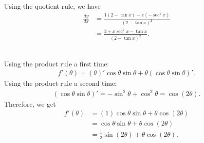 		\spc
		
	\\
	Using the quotient rule, we have
		\begin{align*}
		\frac{dy}{dx} &= \frac{1 (2 - \tan x) - x (-\sec^2 x)}{(2 - \tan x)^2} \\
		&= \frac{2 + x \sec^2 x - \tan x}{(2 - \tan x)^2} .
		\end{align*}
		
	\spc
	
	\\
	Using the product rule a first time:
		\begin{align*}
		f' (\theta ) = (\theta)' \cos \theta \sin \theta + \theta (\cos \theta \sin \theta )' .
		\end{align*}
	Using the product rule a second time:
		\begin{align*}
		(\cos \theta \sin \theta )' = -\sin^2 \theta + \cos^2 \theta = \cos (2\theta ) .
		\end{align*}
	Therefore, we get
		\begin{align*}
		f' (\theta) &= (1) \cos \theta \sin \theta + \theta \cos (2\theta ) \\
		&= \cos \theta \sin \theta + \theta \cos (2 \theta ) \\
		&= \tfrac{1}{2} \sin (2\theta ) + \theta \cos (2\theta ) .
		\end{align*}
	
